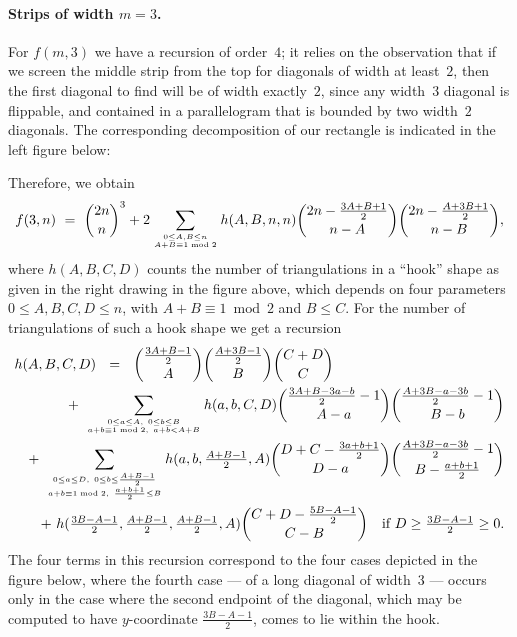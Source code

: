 \paragraph{Strips of width \boldmath$m=3$. }

For $f(m,3)$ we have a recursion of order~$4$; it relies on the
observation that if we screen the middle strip from the 
top for diagonals of width at least~$2$, then the first diagonal
to find will be of width exactly~$2$, since any width~$3$ diagonal
is flippable, and contained in a parallelogram that is
bounded by two width~$2$ diagonals. 
The corresponding decomposition of our rectangle 
is indicated in the left figure below: 
\begin{center}
\centerline{}
\end{center}
Therefore, we obtain
\[
f(3,n) \ =\ \binom{2n}{n}^3 + 2
\sum_{0\le A,B\le n\atop A+B\equiv1\bmod2}h(A,B,n,n)
\binom{2n-\frac{3A+B+1}{2}}{n-A}
\binom{2n-\frac{A+3B+1}{2}}{n-B},
\]
where $h(A,B,C,D)$ counts the number of triangulations
in a ``hook'' shape as given in the right drawing in the figure above,
which depends on four parameters $0\le A,B,C,D\le n$, 
with $A+B\equiv1\bmod2$ and $B\le C$.
For the number of triangulations of such a hook shape we get a recursion
\begin{eqnarray*}
\lefteqn{h(A,B,C,D) \ \ =\ \  
\binom{\frac{3A+B-1}2}{A} 
\binom{\frac{A+3B-1}2}{B}
\binom{C+D}{C}}\\
&&+\ 
\sum_{0\le a\le A,    \ 0\le b\le B\atop
     a+b\equiv1\bmod2,\ a+b<A+B}
h(a,b,C,D)
\binom{\frac{3A+B-3a-b}{2}-1}{A-a}
\binom{\frac{A+3B-a-3b}{2}-1}{B-b}\\
&&+\ 
\sum_{0\le a\le D,\ 0\le b\le \frac{A+B-1}{2}\atop
     a+b\equiv1\bmod2,\ \frac{a+b+1}{2}\le B}
h(a,b,\tfrac{A+B-1}{2},A)
\binom{D+C-\frac{3a+b+1}{2}}{D-a}
\binom{\tfrac{A+3B-a-3b}{2}-1}{B-\tfrac{a+b+1}{2}}
\\
&&+\ 
h(\tfrac{3B-A-1}{2},\tfrac{A+B-1}{2},\tfrac{A+B-1}{2},A)
\binom{C+D-\frac{5B-A-1}{2}}{C-B}\quad
\textrm{if }D\ge\tfrac{3B-A-1}{2}\ge0.
\end{eqnarray*}
The four terms in this recursion correspond to the 
four cases depicted in the figure below, 
where the fourth case --- of a long diagonal of width~$3$ ---
occurs only in the case where the second endpoint of the
diagonal, which may be computed to have $y$-coordinate
$\frac{3B-A-1}2$, comes to lie within the hook.
\medskip

\noindent%
%

